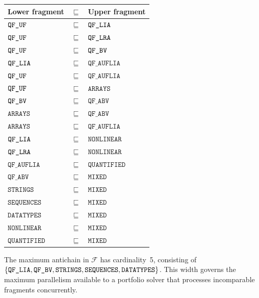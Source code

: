 \documentclass[11pt]{article}
\begin{document}
\begin{center}
\small
\begin{tabular}{@{}lcl@{}}
\toprule
\textbf{Lower fragment} & $\sqsubseteq$ & \textbf{Upper fragment} \\
\midrule
$\texttt{QF\_UF}$        & $\sqsubseteq$ & $\texttt{QF\_LIA}$       \\
$\texttt{QF\_UF}$        & $\sqsubseteq$ & $\texttt{QF\_LRA}$       \\
$\texttt{QF\_UF}$        & $\sqsubseteq$ & $\texttt{QF\_BV}$        \\
$\texttt{QF\_LIA}$       & $\sqsubseteq$ & $\texttt{QF\_AUFLIA}$ \\
$\texttt{QF\_UF}$        & $\sqsubseteq$ & $\texttt{QF\_AUFLIA}$ \\
$\texttt{QF\_UF}$        & $\sqsubseteq$ & $\texttt{ARRAYS}$ \\
$\texttt{QF\_BV}$        & $\sqsubseteq$ & $\texttt{QF\_ABV}$ \\
$\texttt{ARRAYS}$ & $\sqsubseteq$ & $\texttt{QF\_ABV}$ \\
$\texttt{ARRAYS}$ & $\sqsubseteq$ & $\texttt{QF\_AUFLIA}$ \\
$\texttt{QF\_LIA}$       & $\sqsubseteq$ & $\texttt{NONLINEAR}$ \\
$\texttt{QF\_LRA}$       & $\sqsubseteq$ & $\texttt{NONLINEAR}$ \\
$\texttt{QF\_AUFLIA}$ & $\sqsubseteq$ & $\texttt{QUANTIFIED}$ \\
$\texttt{QF\_ABV}$    & $\sqsubseteq$ & $\texttt{MIXED}$ \\
$\texttt{STRINGS}$    & $\sqsubseteq$ & $\texttt{MIXED}$ \\
$\texttt{SEQUENCES}$  & $\sqsubseteq$ & $\texttt{MIXED}$ \\
$\texttt{DATATYPES}$  & $\sqsubseteq$ & $\texttt{MIXED}$ \\
$\texttt{NONLINEAR}$  & $\sqsubseteq$ & $\texttt{MIXED}$ \\
$\texttt{QUANTIFIED}$ & $\sqsubseteq$ & $\texttt{MIXED}$ \\
\bottomrule
\end{tabular}
\end{center}

\begin{remark}
The maximum antichain in $\mathcal{F}$ has cardinality~5,
consisting of $\{\texttt{QF\_LIA}, \texttt{QF\_BV}, \texttt{STRINGS},
\texttt{SEQUENCES}, \texttt{DATATYPES}\}$.  This width
governs the maximum parallelism available to a portfolio
solver that processes incomparable fragments concurrently.
\end{remark}
\end{document}
